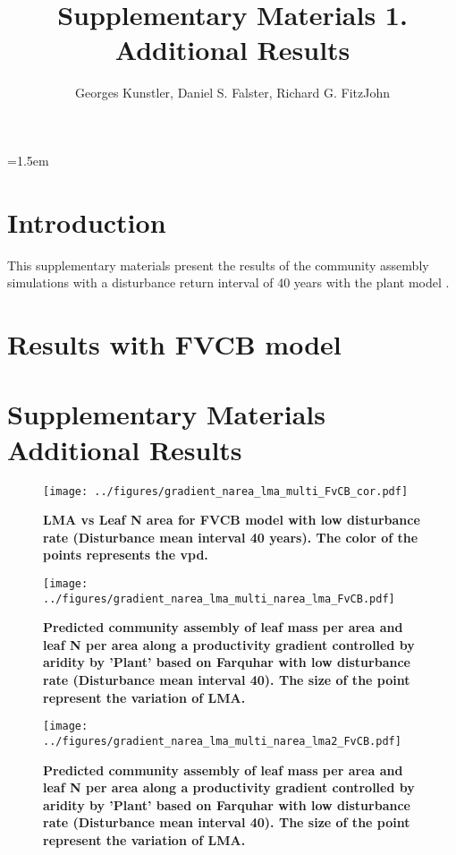 \documentclass[a4paper,11pt]{article}
\title{Supplementary Materials 1. Additional Results}
\author{Georges Kunstler, Daniel S. Falster, Richard G. FitzJohn}
\date{}
\affiliation{INRAE LESSEM, Grenoble, France and Department of Biological Sciences, Macquarie University,
  Sydney, Australia}
\date{}
\begin{document}
\mstitleshort
\parindent=1.5em
\addtolength{\parskip}{.3em}


\section{Introduction}

This supplementary materials present the results of the community
assembly simulations with a disturbance return interval of 40 years
with the plant model \citep{Falster-2016,Falster-2017}.

\clearpage

\section{Results with FVCB model}
\section{Supplementary Materials Additional Results}


\begin{figure}[ht]
\centering
\texttt{[image: ../figures/gradient\_narea\_lma\_multi\_FvCB\_cor.pdf]}
\caption{\textbf{LMA vs Leaf N area for FVCB model with low disturbance rate (Disturbance mean interval 40 years). The color of the points represents the vpd.}
\label{fig:lma_narea_cor_multiSM}}
\end{figure}



\begin{figure}[ht]
\centering
\texttt{[image: ../figures/gradient\_narea\_lma\_multi\_narea\_lma\_FvCB.pdf]}
\caption{\textbf{Predicted community assembly of leaf mass per area and leaf N per area along a productivity gradient controlled by aridity by 'Plant' based on Farquhar with low disturbance rate (Disturbance mean interval 40). The size of the point represent the variation of LMA.}
\label{fig:lma_nareaFlSM}}
\end{figure}

\begin{figure}[ht]
\centering
\texttt{[image: ../figures/gradient\_narea\_lma\_multi\_narea\_lma2\_FvCB.pdf]}
\caption{\textbf{Predicted community assembly of leaf mass per area and leaf N per area along a productivity gradient controlled by aridity by 'Plant' based on Farquhar with low disturbance rate (Disturbance mean interval 40). The size of the point represent the variation of LMA.}
\label{fig:lma_nareaFl2SM}}
\end{figure}
\end{document}
